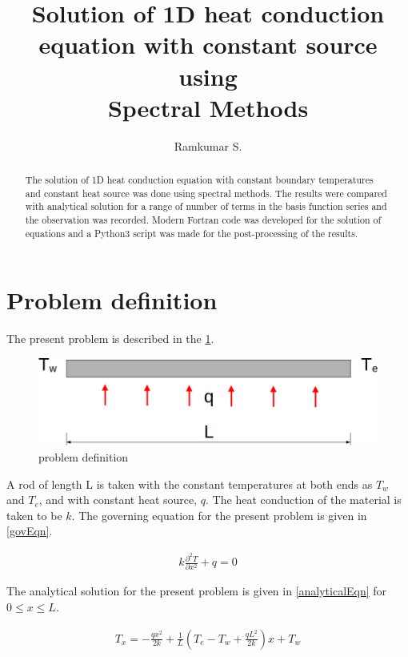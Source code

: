 \documentclass[conf]{new-aiaa}
\title{Solution of 1D heat conduction equation with constant source \\ using \\ Spectral Methods}
\author{Ramkumar S.}
\begin{document}
\maketitle

\begin{abstract}
    The solution of 1D heat conduction equation with constant boundary temperatures
    and constant heat source was done using spectral methods. The results were
    compared with analytical solution for a range of number of terms in the
    basis function series and the observation was recorded. Modern Fortran code was
    developed for the solution of equations and a Python3 script was made for
    the post-processing of the results.
\end{abstract}

\section{Problem definition}
\par The present problem is described in the \cref{problem_description}.
\vspace{1cm}
\begin{figure}[!h]
   \center
    \includegraphics[scale=0.2]{supportingFiles/schematic.png}
    \caption{problem definition}
    \label{problem_description}
\end{figure}

\par A rod of length L is taken with the constant temperatures at both ends
as $T_w$ and $T_e$, and with constant heat source, $q$. The heat conduction
of the material is taken to be $k$. The governing equation for the present
problem is given in \cref{govEqn}.

\begin{align}
    k\frac{\partial^2 T}{\partial x^2} + q = 0 \label{govEqn}
\end{align}

\par The analytical solution for the present problem is given in \cref{analyticalEqn}
for \(\displaystyle{0 \le x \le L}\).

\begin{align}
    T_x = -\frac{q x^2 }{2 k} + \frac{1}{L}\left(T_e-T_w + \frac{q L^2}{2 k}\right)x + T_w \label{analyticalEqn}
\end{align}
\end{document}
